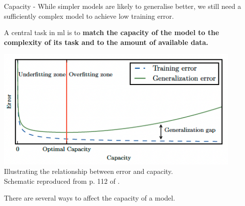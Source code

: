 \begin{frame}[t,allowframebreaks]{Capacity -}
    While simpler models are likely to generalise better,
    we still need a sufficiently complex model to achieve low training error.

    \framebreak


    A central task in \gls{ml} is to {\bf match the capacity of the model
    to the complexity of its task and to the amount of available data.}\\

    \vspace{0.1cm}

    \begin{center}
        \includegraphics[width=0.90\textwidth]
            {./images/training_issues/goodfellow17_error_vs_capacity_1.png}\\
        {\tiny 
            Illustrating the relationship between error and capacity.\\
            \color{col:attribution} 
            Schematic reproduced from p. 112 of \cite{Goodfellow:2017MITDL}.\\
        }
    \end{center}

    \framebreak


    There are several ways to affect the capacity of a model.


\end{frame}
